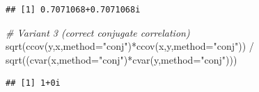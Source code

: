 \documentclass[
]{book}
\newenvironment{Shaded}{\begin{snugshade}}{\end{snugshade}}
\newcommand{\AttributeTok}[1]{\textcolor[rgb]{0.77,0.63,0.00}{#1}}
\newcommand{\CommentTok}[1]{\textcolor[rgb]{0.56,0.35,0.01}{\textit{#1}}}
\newcommand{\FunctionTok}[1]{\textcolor[rgb]{0.00,0.00,0.00}{#1}}
\newcommand{\NormalTok}[1]{#1}
\newcommand{\SpecialCharTok}[1]{\textcolor[rgb]{0.00,0.00,0.00}{#1}}
\newcommand{\StringTok}[1]{\textcolor[rgb]{0.31,0.60,0.02}{#1}}
\begin{document}
\begin{verbatim}
## [1] 0.7071068+0.7071068i
\end{verbatim}

\begin{Shaded}
\begin{Highlighting}[]
\CommentTok{\# Variant 3 (correct conjugate correlation)}
\FunctionTok{sqrt}\NormalTok{(}\FunctionTok{ccov}\NormalTok{(y,x,}\AttributeTok{method=}\StringTok{"conj"}\NormalTok{)}\SpecialCharTok{*}\FunctionTok{ccov}\NormalTok{(x,y,}\AttributeTok{method=}\StringTok{"conj"}\NormalTok{)) }\SpecialCharTok{/}
    \FunctionTok{sqrt}\NormalTok{((}\FunctionTok{cvar}\NormalTok{(x,}\AttributeTok{method=}\StringTok{"conj"}\NormalTok{)}\SpecialCharTok{*}\FunctionTok{cvar}\NormalTok{(y,}\AttributeTok{method=}\StringTok{"conj"}\NormalTok{)))}
\end{Highlighting}
\end{Shaded}

\begin{verbatim}
## [1] 1+0i
\end{verbatim}
\end{document}
